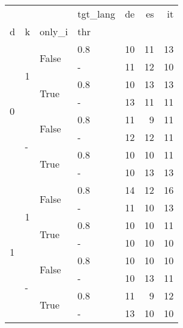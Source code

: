 \begin{tabular}{llllrrr}
  \toprule
  &  &  & tgt\_lang & de & es & it \\
  d & k & only\_i & thr &  &  &  \\
  \midrule
  \multirow[t]{8}{*}{0} & \multirow[t]{4}{*}{1} & \multirow[t]{2}{*}{False} & 0.8 & 10 & 11 & 13 \\
  &  &  & - & 11 & 12 & 10 \\
  \cline{3-7}
  &  & \multirow[t]{2}{*}{True} & 0.8 & 10 & 13 & 13 \\
  &  &  & - & 13 & 11 & 11 \\
  \cline{2-7} \cline{3-7}
  & \multirow[t]{4}{*}{-} & \multirow[t]{2}{*}{False} & 0.8 & 11 & 9 & 11 \\
  &  &  & - & 12 & 12 & 11 \\
  \cline{3-7}
  &  & \multirow[t]{2}{*}{True} & 0.8 & 10 & 10 & 11 \\
  &  &  & - & 10 & 13 & 13 \\
  \cline{1-7} \cline{2-7} \cline{3-7}
  \multirow[t]{8}{*}{1} & \multirow[t]{4}{*}{1} & \multirow[t]{2}{*}{False} & 0.8 & 14 & 12 & 16 \\
  &  &  & - & 11 & 10 & 13 \\
  \cline{3-7}
  &  & \multirow[t]{2}{*}{True} & 0.8 & 10 & 10 & 11 \\
  &  &  & - & 10 & 10 & 10 \\
  \cline{2-7} \cline{3-7}
  & \multirow[t]{4}{*}{-} & \multirow[t]{2}{*}{False} & 0.8 & 10 & 10 & 10 \\
  &  &  & - & 10 & 13 & 11 \\
  \cline{3-7}
  &  & \multirow[t]{2}{*}{True} & 0.8 & 11 & 9 & 12 \\
  &  &  & - & 13 & 10 & 10 \\
  \cline{1-7} \cline{2-7} \cline{3-7}
  \bottomrule
\end{tabular}
